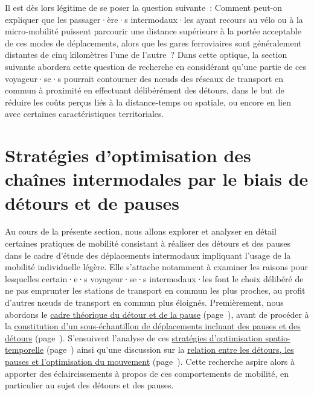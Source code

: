 \begin{refsegment}
Il est dès lors légitime de se poser la question suivante~: Comment peut-on expliquer que les passager·ère·s intermodaux·les ayant recours au vélo ou à la micro-mobilité puissent parcourir une distance supérieure à la portée acceptable de ces modes de déplacements, alors que les gares ferroviaires sont généralement distantes de cinq kilomètres l'une de l'autre~? Dans cette optique, la section suivante abordera cette question de recherche en considérant qu'une partie de ces voyageur·se·s pourrait contourner des nœuds des réseaux de transport en commun à proximité en effectuant délibérément des détours, dans le but de réduire les coûts perçus liés à la distance-temps ou spatiale, ou encore en lien avec certaines caractéristiques territoriales.%

    \newpage
\section{Stratégies d'optimisation des chaînes intermodales par le biais de détours et de pauses
    \label{chap5:detours-pauses-optimisation}
    }

Au cours de la présente section, nous allons explorer et analyser en détail certaines pratiques de mobilité consistant à réaliser des détours et des pauses dans le cadre d'étude des déplacements intermodaux impliquant l'usage de la mobilité individuelle légère. Elle s'attache notamment à examiner les raisons pour lesquelles certain·e·s voyageur·se·s intermodaux·les font le choix délibéré de ne pas emprunter les stations de transport en commun les plus proches, au profit d'autres nœuds de transport en commun plus éloignés. Premièrement, nous abordons le \hyperref[chap5:enjeux-detours-pauses]{cadre théorique du détour et de la pause} (page~\pageref{chap5:enjeux-detours-pauses}), avant de procéder à la \hyperref[chap5:methodes-statistiques]{constitution d'un sous-échantillon de déplacements incluant des pauses et des détours} (page~\pageref{chap5:methodes-statistiques}). S'ensuivent l'analyse de ces \hyperref[chap5:strategies-optimisation]{stratégies d'optimisation spatio-temporelle} (page~\pageref{chap5:strategies-optimisation}) ainsi qu'une discussion sur la \hyperref[chap5:discussion-detours-pauses-optimisation]{relation entre les détours, les pauses et l'optimisation du mouvement} (page~\pageref{chap5:discussion-detours-pauses-optimisation}). Cette recherche aspire alors à apporter des éclaircissements à propos de ces comportements de mobilité, en particulier au sujet des détours et des pauses.%


\end{refsegment}
